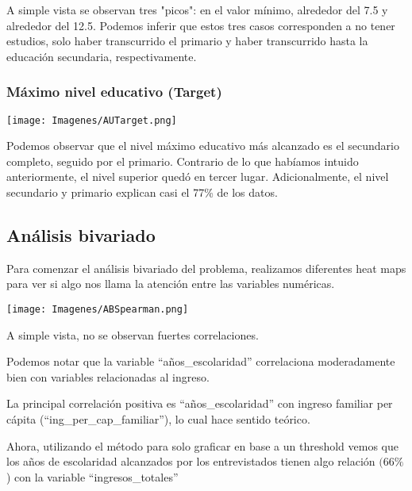 \documentclass[a4paper]{article}
\begin{document}
            A simple vista se observan tres "picos": en el valor mínimo, alrededor del 7.5 y alrededor del 12.5. Podemos inferir que estos tres casos corresponden a no tener estudios, solo haber transcurrido el primario y haber transcurrido hasta la educación secundaria, respectivamente.
           
            \subsubsection{Máximo nivel educativo (Target)}
           
            \begin{center}
                \texttt{[image: Imagenes/AUTarget.png]}    
            \end{center}
           
            Podemos observar que el nivel máximo educativo más alcanzado es el secundario completo, seguido por el primario. Contrario de lo que habíamos intuido anteriormente, el nivel superior quedó en tercer lugar. Adicionalmente, el nivel secundario y primario explican casi el 77\% de los datos.

    
    \newpage
    
    \subsection{Análisis bivariado}
 
        Para comenzar el análisis bivariado del problema, realizamos diferentes heat maps para ver si algo nos llama la atención entre las variables numéricas.        
       
        \begin{center}
            \texttt{[image: Imagenes/ABSpearman.png]}
        \end{center}
 
        A simple vista, no se observan fuertes correlaciones.
 
        Podemos notar que la variable ``años\_escolaridad'' correlaciona moderadamente bien con variables relacionadas al ingreso.
 
        La principal correlación positiva es ``años\_escolaridad'' con ingreso familiar per cápita (``ing\_per\_cap\_familiar''), lo cual hace sentido teórico.
 
        Ahora, utilizando el método para solo graficar en base a un threshold vemos que los años de escolaridad alcanzados por los entrevistados tienen algo relación $(66\%$) con la variable ``ingresos\_totales''
\end{document}
